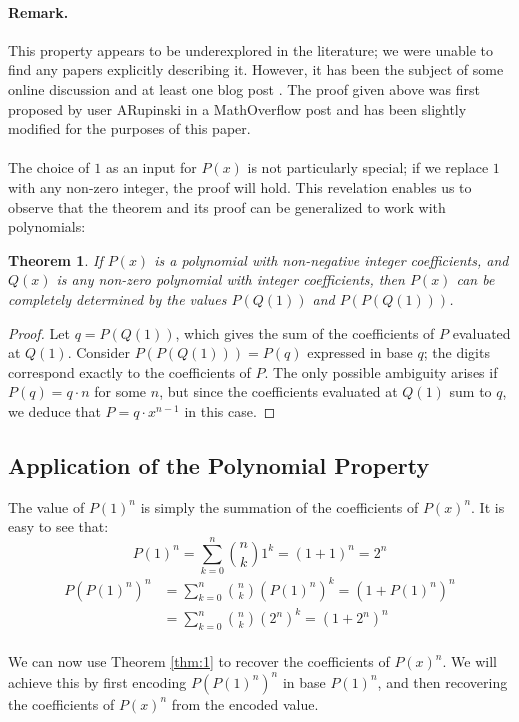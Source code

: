 \documentclass{article}
\theoremstyle{plain}
\newtheorem{thm}{Theorem}
\begin{document}
\paragraph{\textbf{Remark.}}
This property appears to be underexplored in the literature; we were unable to find any papers explicitly describing it. However, it has been the subject of some online discussion and at least one blog post \cite{jcook}. The proof given above was first proposed by user ARupinski in a MathOverflow post \cite{arupinski} and has been slightly modified for the purposes of this paper.
\\
\\
The choice of $1$ as an input for $P(x)$ is not particularly special; if we replace $1$ with any non-zero integer, the proof will hold. This revelation enables us to observe that the theorem and its proof can be generalized to work with polynomials:

\begin{thm}
\label{thm:2}
If $P(x)$ is a polynomial with non-negative integer coefficients, and $Q(x)$ is any non-zero polynomial with integer coefficients, then $P(x)$ can be completely determined by the values $P(Q(1))$ and $P(P(Q(1)))$.
\end{thm}
\begin{proof}
Let $q = P(Q(1))$, which gives the sum of the coefficients of $P$ evaluated at $Q(1)$. Consider $P(P(Q(1))) = P(q)$ expressed in base $q$; the digits correspond exactly to the coefficients of $P$. The only possible ambiguity arises if $P(q) = q\cdot n$ for some $n$, but since the coefficients evaluated at $Q(1)$ sum to $q$, we deduce that $P = q \cdot x^{n-1}$ in this case.
\end{proof}

\subsection{Application of the Polynomial Property}
The value of $P(1)^{n}$ is simply the summation of the coefficients of $P(x)^{n}$. It is easy to see that:
\begin{equation}
P(1)^{n} = \sum_{k=0}^{n} \binom{n}{k} 1^{k} = (1 + 1)^{n} = 2^{n}
\end{equation}
\begin{align}
P(P(1)^{n})^{n} &= \sum_{k=0}^{n} \binom{n}{k} (P(1)^{n})^{k} = (1 + P(1)^{n})^{n} \\
&= \sum_{k=0}^{n} \binom{n}{k} (2^{n})^{k} = (1 + 2^{n})^{n}
\end{align}
\\
We can now use Theorem \ref{thm:1} to recover the coefficients of $P(x)^{n}$. We will achieve this by first encoding $P(P(1)^{n})^{n}$ in base $P(1)^{n}$, and then recovering the coefficients of $P(x)^n$ from the encoded value.
\end{document}
